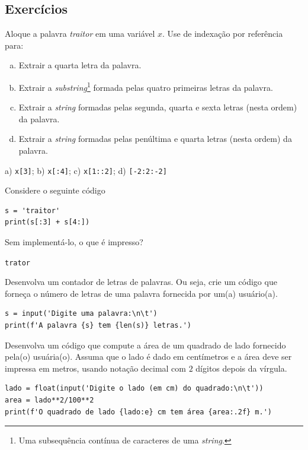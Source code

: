 \subsection{Exercícios}

\begin{exer}
  Aloque a palavra \textit{traitor} em uma variável $x$. Use de indexação por referência para:
  \begin{enumerate}[a)]
  \item Extrair a quarta letra da palavra.
  \item Extrair a \textit{substring}\footnote{Uma subsequência contínua de caracteres de uma \textit{string}.} formada pelas quatro primeiras letras da palavra.
  \item Extrair a \textit{string} formadas pelas segunda, quarta e sexta letras (nesta ordem) da palavra.
  \item Extrair a \textit{string} formadas pelas penúltima e quarta letras (nesta ordem) da palavra.
  \end{enumerate}
\end{exer}
\begin{resp}
  a) \lstinline+x[3]+; b) \lstinline+x[:4]+; c) \lstinline+x[1::2]+; d) \lstinline+[-2:2:-2]+
\end{resp}

\begin{exer}
  Considere o seguinte código
\begin{lstlisting}
s = 'traitor'
print(s[:3] + s[4:])
\end{lstlisting}
  Sem implementá-lo, o que é impresso?
\end{exer}
\begin{resp}
  \lstinline+trator+
\end{resp}

\begin{exer}
  Desenvolva um contador de letras de palavras. Ou seja, crie um código que forneça o número de letras de uma palavra fornecida por um(a) usuário(a).
\end{exer}
\begin{resp}
\begin{lstlisting}
s = input('Digite uma palavra:\n\t')
print(f'A palavra {s} tem {len(s)} letras.')
\end{lstlisting}
\end{resp}

\begin{exer}
  Desenvolva um código que compute a área de um quadrado de lado fornecido pela(o) usuária(o). Assuma que o lado é dado em centímetros e a área deve ser impressa em metros, usando notação decimal com $2$ dígitos depois da vírgula.
\end{exer}
\begin{resp}
\begin{lstlisting}
lado = float(input('Digite o lado (em cm) do quadrado:\n\t'))
area = lado**2/100**2
print(f'O quadrado de lado {lado:e} cm tem área {area:.2f} m.')
\end{lstlisting}
\end{resp}

